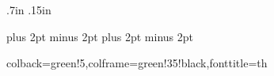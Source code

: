 \marginparwidth .7in \marginparsep .15in

\setlength{\textwidth}{165 mm}
\setlength{\evensidemargin}{-3 mm}

\setlength{\oddsidemargin}{\evensidemargin}
\setlength{\textheight}{245 mm}
\setlength{\topmargin}{-20 mm}


\floatsep 8pt plus 2pt minus 2pt
\textfloatsep 8pt plus 2pt minus 2pt

\makeatletter
\renewcommand\section{\@startsection {section}{1}{\z@}%
	{-2ex \@plus -1ex \@minus -.2ex}%
	{1.5ex \@plus.2ex}%
	{\normalfont\large\bfseries}}
\renewcommand\subsection{\@startsection{subsection}{2}{\z@}%
	{-2ex\@plus -1ex \@minus -.2ex}%
	{1ex \@plus .2ex}%
	{\normalfont\normalsize\bfseries}}
\renewcommand\subsubsection{\@startsection{subsubsection}{3}{\z@}%
	{1.5ex\@plus 1ex \@minus .2ex}%
	{.5ex \@plus .2ex}%
	{\normalfont\normalsize\bfseries}}
\setcounter{secnumdepth}{3}
\renewcommand{\paragraph}{%
	\@startsection{paragraph}{4}%
	{\z@}{1.2ex \@plus 1ex \@minus .2ex}{-1em}%
	{\normalfont\normalsize\bfseries}}
\makeatother

\let\OLDthebibliography\thebibliography
\renewcommand\thebibliography[1]{
	\OLDthebibliography{#1}
	\setlength{\parskip}{0pt}
	\setlength{\itemsep}{0pt plus 0.3ex}
}

\usepackage{tcolorbox}

%
{colback=green!5,colframe=green!35!black,fonttitle=\bfseries}{th}

